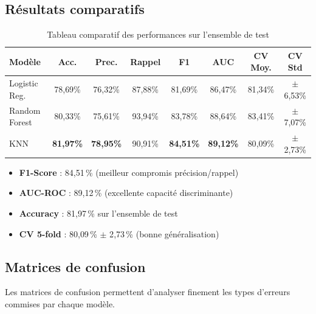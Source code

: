 \documentclass[12pt,a4paper]{article}
\newcommand{\best}[1]{\textbf{\textcolor{medgreen}{#1}}}
\begin{document}
		\subsection{Résultats comparatifs}

			\begin{table}[H]
			\centering
			\caption{Tableau comparatif des performances sur l'ensemble de test}
			\label{tab:results}
			\begin{tabular}{lccccccc}
				\toprule
				\textbf{Modèle} & \textbf{Acc.} & \textbf{Prec.} & \textbf{Rappel} & \textbf{F1} & \textbf{AUC} & \textbf{CV Moy.} & \textbf{CV Std} \\
				\midrule
				Logistic Reg.   & 78{,}69\% & 76{,}32\% & 87{,}88\% & 81{,}69\% & 86{,}47\% & 81{,}34\% & $\pm$6{,}53\% \\
				Random Forest & 80{,}33\% & 75{,}61\% & 93{,}94\% & 83{,}78\% & 88{,}64\% & 83{,}41\% & $\pm$7{,}07\% \\
				KNN             & \best{81{,}97\%} & \best{78{,}95\%} & 90{,}91\% & \best{84{,}51\%} & \best{89{,}12\%} & 80{,}09\% & $\pm$2{,}73\% \\
				\bottomrule
			\end{tabular}
			\end{table}

			\begin{tcolorbox}[resultbox, title={Meilleur modèle : KNN $\bigstar$}]
			\begin{itemize}
				\item \textbf{F1-Score} : 84{,}51\,\% (meilleur compromis précision/rappel)
				\item \textbf{AUC-ROC} : 89{,}12\,\% (excellente capacité discriminante)
				\item \textbf{Accuracy} : 81{,}97\,\% sur l'ensemble de test
				\item \textbf{CV 5-fold} : 80{,}09\,\% $\pm$ 2{,}73\,\% (bonne généralisation)
			\end{itemize}
			\end{tcolorbox}
        \subsection{Matrices de confusion}
            Les matrices de confusion permettent d'analyser finement les types d'erreurs commises par chaque modèle.
            
\end{document}
